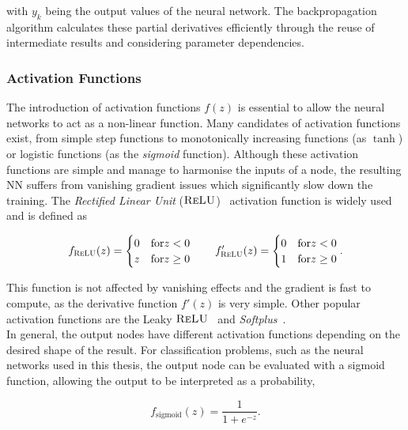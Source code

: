 with $y_k$ being the output values of the neural network. The backpropagation algorithm calculates these partial derivatives efficiently through the reuse of intermediate results and considering parameter dependencies. 

\subsubsection{Activation Functions}

The introduction of activation functions $f(z)$ is essential to allow the neural networks to act as a non-linear function. Many candidates of activation functions exist, from simple step functions to monotonically increasing functions (as $\tanh$) or logistic functions (as the \textit{sigmoid} function). Although these activation functions are simple and manage to harmonise the inputs of a node, the resulting NN suffers from vanishing gradient issues which significantly slow down the training. The \textit{Rectified Linear Unit} ($\textsc{ReLU}$)~\cite{relu} activation function is widely used and is defined as

\begin{align}
    f_\textsc{ReLU}(z)= \begin{cases}
            0& \text{for}  z<0 \\
            z& \text{for}  z\geq0\\
            \end{cases}\qquad f'_\textsc{ReLU}(z)= \begin{cases}
                0& \text{for}  z<0 \\
                1& \text{for}  z\geq0\\
                \end{cases}.
\end{align}

This function is not affected by vanishing effects and the gradient is fast to compute, as the derivative function $f'(z)$ is very simple. Other popular activation functions are the Leaky $\textsc{ReLU}$~\cite{lrelu} and \textit{Softplus}~\cite{Maas2013RectifierNI}.\\

In general, the output nodes have different activation functions depending on the desired shape of the result. For classification problems, such as the neural networks used in this thesis, the output node can be evaluated with a sigmoid function, allowing the output to be interpreted as a probability,

\begin{equation}
    f_\text{sigmoid}(z)=\frac{1}{1+e^{-z}}.
\end{equation}

